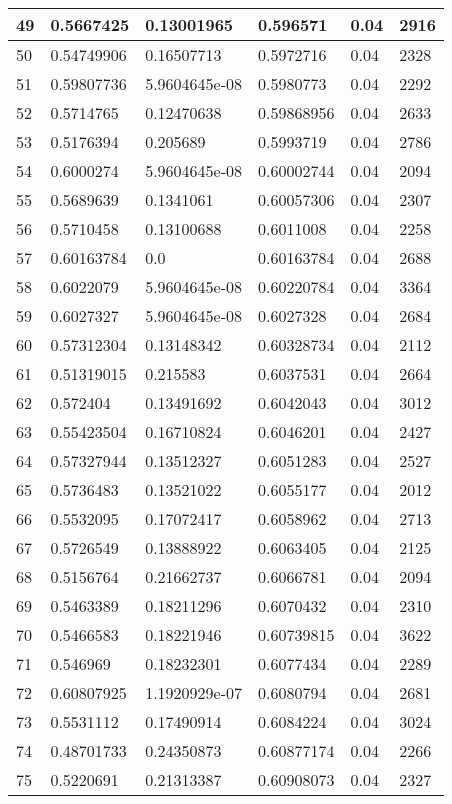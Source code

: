 \begin{longtable}{|l|l|l|l|l|l|}
49 & 0.5667425 & 0.13001965 & 0.596571 & 0.04 & 2916 \\ \hline 
50 & 0.54749906 & 0.16507713 & 0.5972716 & 0.04 & 2328 \\ \hline 
51 & 0.59807736 & 5.9604645e-08 & 0.5980773 & 0.04 & 2292 \\ \hline 
52 & 0.5714765 & 0.12470638 & 0.59868956 & 0.04 & 2633 \\ \hline 
53 & 0.5176394 & 0.205689 & 0.5993719 & 0.04 & 2786 \\ \hline 
54 & 0.6000274 & 5.9604645e-08 & 0.60002744 & 0.04 & 2094 \\ \hline 
55 & 0.5689639 & 0.1341061 & 0.60057306 & 0.04 & 2307 \\ \hline 
56 & 0.5710458 & 0.13100688 & 0.6011008 & 0.04 & 2258 \\ \hline 
57 & 0.60163784 & 0.0 & 0.60163784 & 0.04 & 2688 \\ \hline 
58 & 0.6022079 & 5.9604645e-08 & 0.60220784 & 0.04 & 3364 \\ \hline 
59 & 0.6027327 & 5.9604645e-08 & 0.6027328 & 0.04 & 2684 \\ \hline 
60 & 0.57312304 & 0.13148342 & 0.60328734 & 0.04 & 2112 \\ \hline 
61 & 0.51319015 & 0.215583 & 0.6037531 & 0.04 & 2664 \\ \hline 
62 & 0.572404 & 0.13491692 & 0.6042043 & 0.04 & 3012 \\ \hline 
63 & 0.55423504 & 0.16710824 & 0.6046201 & 0.04 & 2427 \\ \hline 
64 & 0.57327944 & 0.13512327 & 0.6051283 & 0.04 & 2527 \\ \hline 
65 & 0.5736483 & 0.13521022 & 0.6055177 & 0.04 & 2012 \\ \hline 
66 & 0.5532095 & 0.17072417 & 0.6058962 & 0.04 & 2713 \\ \hline 
67 & 0.5726549 & 0.13888922 & 0.6063405 & 0.04 & 2125 \\ \hline 
68 & 0.5156764 & 0.21662737 & 0.6066781 & 0.04 & 2094 \\ \hline 
69 & 0.5463389 & 0.18211296 & 0.6070432 & 0.04 & 2310 \\ \hline 
70 & 0.5466583 & 0.18221946 & 0.60739815 & 0.04 & 3622 \\ \hline 
71 & 0.546969 & 0.18232301 & 0.6077434 & 0.04 & 2289 \\ \hline 
72 & 0.60807925 & 1.1920929e-07 & 0.6080794 & 0.04 & 2681 \\ \hline 
73 & 0.5531112 & 0.17490914 & 0.6084224 & 0.04 & 3024 \\ \hline 
74 & 0.48701733 & 0.24350873 & 0.60877174 & 0.04 & 2266 \\ \hline 
75 & 0.5220691 & 0.21313387 & 0.60908073 & 0.04 & 2327 \\ \hline 
\end{longtable}